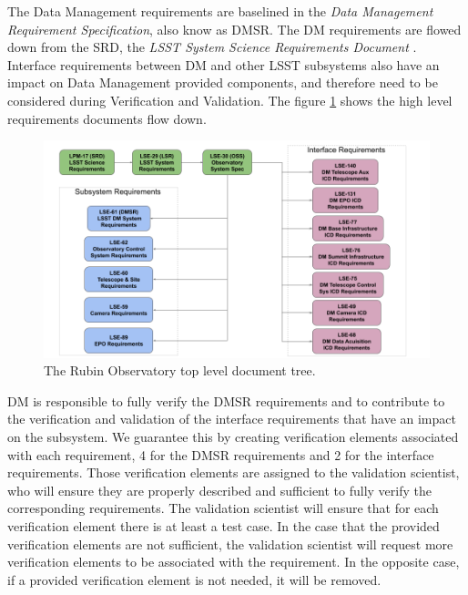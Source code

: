 The Data Management requirements are baselined in the \textit{Data Management Requirement Specification}\cite{LSE-61}, also know as DMSR.
The DM requirements are flowed down from the SRD, the \textit{LSST System Science Requirements Document} \cite{LPM-17}. 
Interface requirements between DM and other LSST subsystems also have an impact on Data Management provided components, 
and therefore need to be considered during Verification and Validation. 
The figure \ref{fig:topdoctree} shows the high level requirements documents flow down.

\begin{figure}
\begin{center}
\includegraphics[width=\textwidth]{imgs/TopLevelDocTree.png}
 \caption{The Rubin Observatory top level document tree.}
 \label{fig:topdoctree}
\end{center}
\end{figure}

DM is responsible to fully verify the DMSR requirements and to contribute to the verification and validation of the interface requirements that have an impact on the subsystem.
We guarantee this by creating verification elements associated with each requirement, 4 for the DMSR requirements and 2 for the interface requirements.
Those verification elements are assigned to the validation scientist, 
who will ensure they are properly described and sufficient to fully verify the corresponding requirements. 
The validation scientist will ensure that for each verification element there is at least a test case.
In the case that the provided verification elements are not sufficient, the validation scientist will request more verification elements to be associated with the requirement.
In the opposite case, if a provided verification element is not needed, it will be removed.

